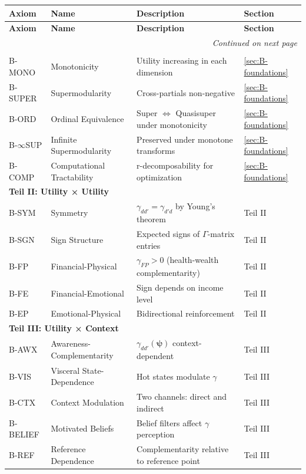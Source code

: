 \begin{longtable}{p{2cm}p{4cm}p{6.5cm}p{2cm}}
\toprule
\textbf{Axiom} & \textbf{Name} & \textbf{Description} & \textbf{Section} \\
\midrule
\endfirsthead
\toprule
\textbf{Axiom} & \textbf{Name} & \textbf{Description} & \textbf{Section} \\
\midrule
\endhead
\midrule
\multicolumn{4}{r}{\textit{Continued on next page}} \\
\endfoot
\bottomrule
\endlastfoot

\multicolumn{4}{l}{\textbf{Teil I: Foundations}} \\
B-MONO & Monotonicity & Utility increasing in each dimension & \ref{sec:B-foundations} \\
B-SUPER & Supermodularity & Cross-partials non-negative & \ref{sec:B-foundations} \\
B-ORD & Ordinal Equivalence & Super $\Leftrightarrow$ Quasisuper under monotonicity & \ref{sec:B-foundations} \\
B-$\infty$SUP & Infinite Supermodularity & Preserved under monotone transforms & \ref{sec:B-foundations} \\
B-COMP & Computational Tractability & r-decomposability for optimization & \ref{sec:B-foundations} \\
\midrule

\multicolumn{4}{l}{\textbf{Teil II: Utility × Utility}} \\
B-SYM & Symmetry & $\gamma_{dd'} = \gamma_{d'd}$ by Young's theorem & Teil II \\
B-SGN & Sign Structure & Expected signs of $\Gamma$-matrix entries & Teil II \\
B-FP & Financial-Physical & $\gamma_{FP} > 0$ (health-wealth complementarity) & Teil II \\
B-FE & Financial-Emotional & Sign depends on income level & Teil II \\
B-EP & Emotional-Physical & Bidirectional reinforcement & Teil II \\
\midrule

\multicolumn{4}{l}{\textbf{Teil III: Utility × Context}} \\
B-AWX & Awareness-Complementarity & $\gamma_{dd'}(\boldsymbol{\psi})$ context-dependent & Teil III \\
B-VIS & Visceral State-Dependence & Hot states modulate $\gamma$ & Teil III \\
B-CTX & Context Modulation & Two channels: direct and indirect & Teil III \\
B-BELIEF & Motivated Beliefs & Belief filters affect $\gamma$ perception & Teil III \\
B-REF & Reference Dependence & Complementarity relative to reference point & Teil III \\
\midrule


\end{longtable}
